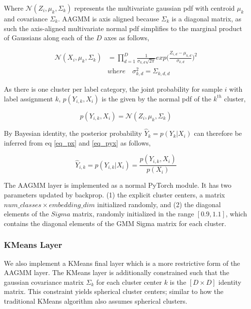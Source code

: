 \documentclass[10pt,twocolumn,letterpaper]{article}
\begin{document}
Where $\mathcal{N}(Z_i, \mu_k, \Sigma_k)$ represents the multivariate gaussian pdf with centroid $\mu_k$ and covariance $\Sigma_k$. 
AAGMM is axis aligned because $\Sigma_k$ is a diagonal matrix, as such the axis-aligned multivariate normal pdf simplifies to the marginal product of Gaussians along each of the $D$ axes as follows,

\begin{equation}
	\begin{aligned}
		\mathcal{N} (X_i, \mu_{k}, \Sigma_k) &=  \prod_{d=1}^D \frac{1}{\sigma_{k,d}\sqrt{2 \pi}} exp \Big( \frac{Z_{i,d} - \mu_{k,d}} {\sigma_{k,d}} \Big)^2 \\[10pt]
		&\textit{where} \quad \sigma^2_{k,d} = \Sigma_{k,d,d}
	\end{aligned}
\end{equation}

As there is one cluster per label category, the joint probability for sample $i$ with label assignment $k$, $p(Y_{i,k},X_i)$ is the given by the normal pdf of the $k^{th}$ cluster,

\begin{equation}
	\label{eq_pyx}
	p(Y_{i,k},X_i) = \mathcal{N} (Z_i, \mu_{k}, \Sigma_k) \end{equation}

By Bayesian identity, the posterior probability $\hat{Y}_k=p(Y_{k}|X_i)$ can therefore be inferred from eq \ref{eq_px} and \ref{eq_pyx} as follows,

\begin{equation}
	\hat{Y}_{i,k} = p(Y_{i,k}|X_i) = \frac{p(Y_{i,k}, X_i)}{p(X_i)}
\end{equation}

The AAGMM layer is implemented as a normal PyTorch \cite{pytorch} module.
It has two parameters updated by backprop.
(1) the explicit cluster centers, a matrix $num\_classes \times embedding\_dim$ initialized randomly, and
(2) the diagonal elements of the $Sigma$ matrix, randomly initialized in the range $[0.9, 1.1]$, which contains the diagonal elements of the GMM Sigma matrix for each cluster.

\subsubsection{KMeans Layer}

We also implement a KMeans final layer which is a more restrictive form of the AAGMM layer.
The KMeans layer is additionally constrained such that the gaussian covariance matrix $\Sigma_k$ for each cluster center $k$ is the $[D \times D]$ identity matrix. 
This constraint yields spherical cluster centers; similar to how the traditional KMeans algorithm also assumes spherical clusters.
\end{document}
